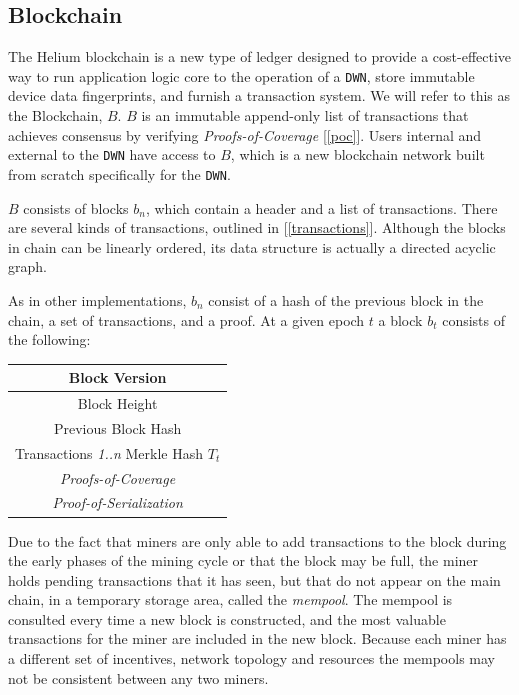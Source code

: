 \documentclass[letterpaper,11pt]{article}
\begin{document}
\subsection{Blockchain} \label{blockchain}

The Helium blockchain is a new type of ledger designed to provide a cost-effective way to run application logic core to the operation of a \verb|DWN|, store immutable device data fingerprints, and furnish a transaction system. We will refer to this as the Blockchain, $B$. $B$ is an immutable append-only list of transactions that achieves consensus by verifying \emph{Proofs-of-Coverage} [\ref{poc}]. Users internal and external to the \verb|DWN| have access to $B$, which is a new blockchain network built from scratch specifically for the \verb|DWN|.

$B$ consists of blocks $b_n$, which contain a header and a list of transactions. There are several kinds of transactions, outlined in [\ref{transactions}]. Although the blocks in chain can be linearly ordered, its data structure is actually a directed acyclic graph.

As in other implementations, $b_n$ consist of a hash of the previous block in the chain, a set of transactions, and a proof. At a given epoch $t$ a block $b_t$ consists of the following:

\begin{center}
    \begin{tabular}{|c|}
    	 \hline
         Block Version \\
         \hline
         Block Height \\
         \hline
         Previous Block Hash \\
         \hline
         Transactions \emph{1..n} Merkle Hash $T_t$ \\
         \hline
         \emph{Proofs-of-Coverage} \\
         \hline
         \emph{Proof-of-Serialization} \\
         \hline
    \end{tabular}
\end{center}

Due to the fact that miners are only able to add transactions to the block during the early phases of the mining cycle or that the block may be full, the miner holds pending transactions that it has seen, but that do not appear on the main chain, in a temporary storage area, called the \emph{mempool}. The mempool is consulted every time a new block is constructed, and the most valuable transactions for the miner are included in the new block. Because each miner has a different set of incentives, network topology and resources the mempools may not be consistent between any two miners.
\end{document}
